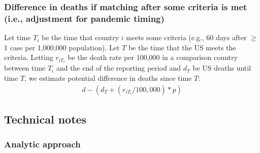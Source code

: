 \documentclass[
]{article}
\begin{document}
\hypertarget{difference-in-deaths-if-matching-after-some-criteria-is-met-i.e.-adjustment-for-pandemic-timing}{%
\subsubsection{Difference in deaths if matching after some criteria is
met (i.e., adjustment for pandemic
timing)}\label{difference-in-deaths-if-matching-after-some-criteria-is-met-i.e.-adjustment-for-pandemic-timing}}

Let time \(T_i\) be the time that country \(i\) meets some criteria
(e.g., 60 days after \(\geq\) 1 case per 1,000,000 population). Let
\(T\) be the time that the US meets the criteria. Letting \(r_{iT_i}\)
be the death rate per 100,000 in a comparison country between time
\(T_i\) and the end of the reporting period and \(d_{T}\) be US deaths
until time \(T\), we estimate potential difference in deaths since time
\(T\): \begin{align}
d - \left(d_{T} + \left(r_{iT_i}/100,000\right)*p\right)
\end{align}

\hypertarget{technical-notes}{%
\subsection{Technical notes}\label{technical-notes}}

\hypertarget{analytic-approach}{%
\subsubsection{Analytic approach}\label{analytic-approach}}
\end{document}
